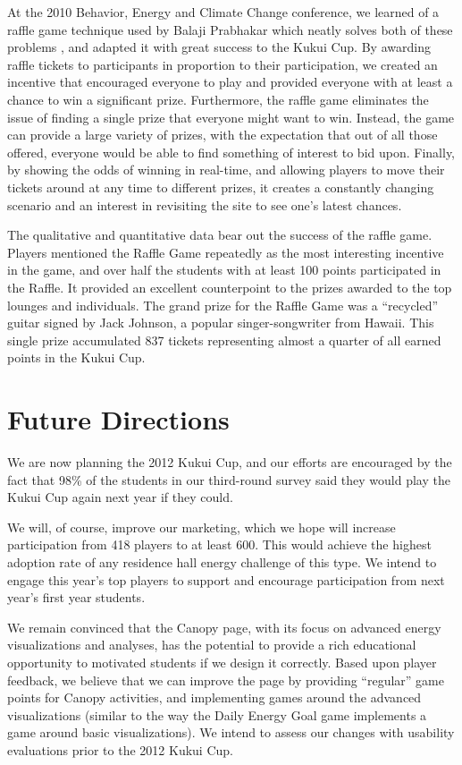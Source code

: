 \documentclass{acm_proc_article-sp}
\begin{document}
At the 2010 Behavior, Energy and Climate Change conference, we learned of a raffle game technique used by Balaji Prabhakar which neatly solves both of these problems \cite{Merugu2009}, and adapted it with great success to the Kukui Cup.  By awarding raffle tickets to participants in proportion to their participation, we created an incentive that encouraged everyone to play and provided everyone with at least a chance to win a significant prize.   Furthermore, the raffle game eliminates the issue of finding a single prize that everyone might want to win. Instead, the game can provide a large variety of prizes, with the expectation that out of all those offered, everyone would be able to find something of interest to bid upon.  Finally, by showing the odds of winning in real-time, and allowing players to move their tickets around at any time to different prizes, it creates a constantly changing scenario and an interest in revisiting the site to see one's latest chances.

The qualitative and quantitative data bear out the success of the raffle
game.  Players mentioned the Raffle Game repeatedly as the most interesting
incentive in the game, and over half the students with at least 100 points
participated in the Raffle.   It provided an excellent counterpoint to the
prizes awarded to the top lounges and individuals. The grand prize for the
Raffle Game was a ``recycled'' guitar signed by Jack Johnson, a popular
singer-songwriter from Hawaii. This single prize accumulated 837 tickets
representing almost a quarter of all earned points in the Kukui Cup.


\section{Future Directions}

We are now planning the 2012 Kukui Cup, and our efforts are encouraged
by the fact that 98\% of the students in our third-round survey said they
would play the Kukui Cup again next year if they could.

We will, of course, improve our marketing, which we hope will increase
participation from 418 players to at least 600. This would achieve the
highest adoption rate of any residence hall energy challenge of this type.
We intend to engage this year's top players to support and encourage
participation from next year's first year students.

We remain convinced that the Canopy page, with its focus on advanced energy
visualizations and analyses, has the potential to provide a rich educational
opportunity to motivated students if we design it correctly.  Based upon player
feedback, we believe that we can improve the page by providing ``regular'' game
points for Canopy activities, and implementing games around the
advanced visualizations (similar to the way the Daily Energy Goal game
implements a game around basic visualizations).  We intend to assess our
changes with usability evaluations prior to the 2012 Kukui Cup.
\end{document}
